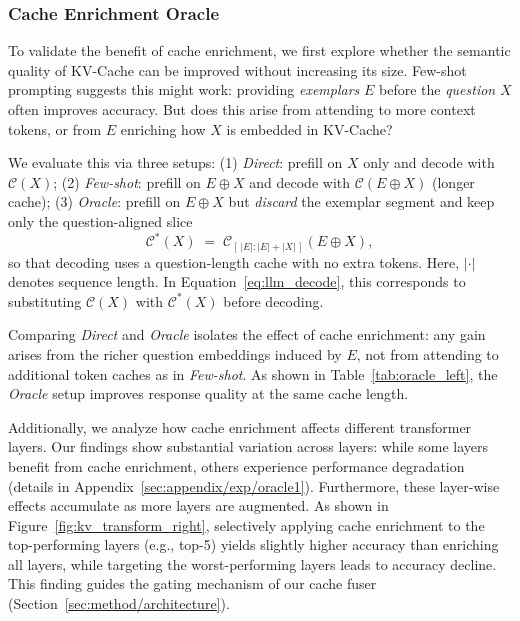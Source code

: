 \subsubsection{Cache Enrichment Oracle}
To validate the benefit of cache enrichment, 
we first explore whether the semantic quality of KV-Cache can be improved without increasing its size. 
Few-shot prompting suggests this might work: providing \emph{exemplars} $E$ before the \emph{question} $X$ often improves accuracy. But does this arise from attending to more context tokens, or from $E$ enriching how $X$ is embedded in KV-Cache?

We evaluate this via three setups:
(1) \textit{Direct}: prefill on $X$ only and decode with $\mathcal{C}(X)$;
(2) \textit{Few-shot}: prefill on $E \oplus X$ and decode with $\mathcal{C}(E \oplus X)$ (longer cache);
(3) \textit{Oracle}: prefill on $E \oplus X$ but \emph{discard} the exemplar segment and keep only the question-aligned slice
\begin{equation}
    \mathcal{C}^*(X) \;=\; \mathcal{C}_{[\,|E| : |E|+|X|\,]}(E \oplus X),
    \label{eq:oracle_cache}
\end{equation}
so that decoding uses a question-length cache with no extra tokens. Here, $|\cdot|$ denotes sequence length. In Equation~\ref{eq:llm_decode}, this corresponds to substituting $\mathcal{C}(X)$ with $\mathcal{C}^*(X)$ before decoding.

Comparing \textit{Direct} and \textit{Oracle} isolates the effect of cache enrichment: any gain arises from the richer question embeddings induced by $E$, not from attending to additional token caches as in \textit{Few-shot}. 
As shown in Table~\ref{tab:oracle_left}, the \textit{Oracle} setup improves response quality at the same cache length. 

Additionally, we analyze how cache enrichment affects different transformer layers. 
Our findings show substantial variation across layers: while some layers benefit from cache enrichment, others experience performance degradation (details in Appendix~\ref{sec:appendix/exp/oracle1}). 
Furthermore, these layer-wise effects accumulate as more layers are augmented.
As shown in Figure~\ref{fig:kv_transform_right}, selectively applying cache enrichment to the top-performing layers (e.g., top-5) yields slightly higher accuracy than enriching all layers, while targeting the worst-performing layers leads to accuracy decline. 
This finding guides the gating mechanism of our cache fuser (Section~\ref{sec:method/architecture}).

